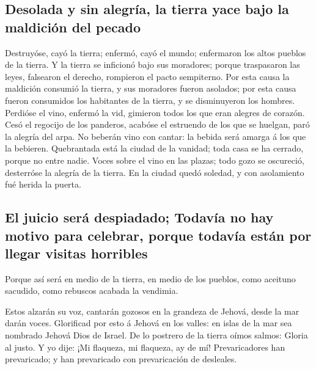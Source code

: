 \hypertarget{desolada-y-sin-alegruxeda-la-tierra-yace-bajo-la-maldiciuxf3n-del-pecado}{%
\subsection{Desolada y sin alegría, la tierra yace bajo la maldición del
pecado}\label{desolada-y-sin-alegruxeda-la-tierra-yace-bajo-la-maldiciuxf3n-del-pecado}}

 Destruyóse, cayó la tierra; enfermó, cayó el mundo;
enfermaron los altos pueblos de la tierra.  Y la tierra se
inficionó bajo sus moradores; porque traspasaron las leyes, falsearon el
derecho, rompieron el pacto sempiterno.  Por esta causa la
maldición consumió la tierra, y sus moradores fueron asolados; por esta
causa fueron consumidos los habitantes de la tierra, y se disminuyeron
los hombres.  Perdióse el vino, enfermó la vid, gimieron
todos los que eran alegres de corazón.  Cesó el regocijo
de los panderos, acabóse el estruendo de los que se huelgan, paró la
alegría del arpa.  No beberán vino con cantar: la bebida
será amarga á los que la bebieren.  Quebrantada está la
ciudad de la vanidad; toda casa se ha cerrado, porque no entre nadie.
 Voces sobre el vino en las plazas; todo gozo se
oscureció, desterróse la alegría de la tierra.  En la
ciudad quedó soledad, y con asolamiento fué herida la puerta.

\hypertarget{el-juicio-seruxe1-despiadado-todavuxeda-no-hay-motivo-para-celebrar-porque-todavuxeda-estuxe1n-por-llegar-visitas-horribles}{%
\subsection{El juicio será despiadado; Todavía no hay motivo para
celebrar, porque todavía están por llegar visitas
horribles}\label{el-juicio-seruxe1-despiadado-todavuxeda-no-hay-motivo-para-celebrar-porque-todavuxeda-estuxe1n-por-llegar-visitas-horribles}}

 Porque así será en medio de la tierra, en medio de los
pueblos, como aceituno sacudido, como rebuscos acabada la vendimia.

 Estos alzarán su voz, cantarán gozosos en la grandeza de
Jehová, desde la mar darán voces.  Glorificad por esto á
Jehová en los valles: en islas de la mar sea nombrado Jehová Dios de
Israel.  De lo postrero de la tierra oímos salmos: Gloria
al justo. Y yo dije: ¡Mi flaqueza, mi flaqueza, ay de mí! Prevaricadores
han prevaricado; y han prevaricado con prevaricación de desleales.

